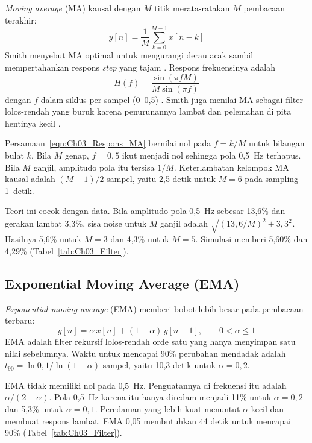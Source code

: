     \textit{Moving average} (MA) kausal dengan $M$ titik merata-ratakan $M$ pembacaan terakhir:
    \begin{equation}
        \label{eqn:Ch03_MA}
        y[n] = \frac{1}{M}\sum_{k=0}^{M-1} x[n-k]
    \end{equation}
    Smith menyebut MA optimal untuk mengurangi derau acak sambil mempertahankan respons \textit{step} yang tajam \cite{smith_dsp}. Respons frekuensinya adalah
    \begin{equation}
        \label{eqn:Ch03_Respons_MA}
        H(f) = \frac{\sin(\pi f M)}{M\sin(\pi f)}
    \end{equation}
    dengan $f$ dalam siklus per sampel (0--0,5) \cite{smith_dsp}. Smith juga menilai MA sebagai filter lolos-rendah yang buruk karena penurunannya lambat dan pelemahan di pita hentinya kecil \cite{smith_dsp}.

    Persamaan~\ref{eqn:Ch03_Respons_MA} bernilai nol pada $f = k/M$ untuk bilangan bulat $k$. Bila $M$ genap, $f = 0{,}5$ ikut menjadi nol sehingga pola 0,5~Hz terhapus. Bila $M$ ganjil, amplitudo pola itu tersisa $1/M$. Keterlambatan kelompok MA kausal adalah $(M-1)/2$ sampel, yaitu 2,5 detik untuk $M = 6$ pada sampling 1~detik.

    Teori ini cocok dengan data. Bila amplitudo pola 0,5~Hz sebesar 13,6\% dan gerakan lambat 3,3\%, sisa noise untuk $M$ ganjil adalah $\sqrt{(13{,}6/M)^2 + 3{,}3^2}$. Hasilnya 5,6\% untuk $M = 3$ dan 4,3\% untuk $M = 5$. Simulasi memberi 5,60\% dan 4,29\% (Tabel~\ref{tab:Ch03_Filter}).

    \subsection{Exponential Moving Average (EMA)}
    \label{sec:Penyaringan_EMA}

    \textit{Exponential moving average} (EMA) memberi bobot lebih besar pada pembacaan terbaru:
    \begin{equation}
        \label{eqn:Ch03_EMA}
        y[n] = \alpha\,x[n] + (1-\alpha)\,y[n-1], \qquad 0 < \alpha \le 1
    \end{equation}
    EMA adalah filter rekursif lolos-rendah orde satu yang hanya menyimpan satu nilai sebelumnya. Waktu untuk mencapai 90\% perubahan mendadak adalah $t_{90} = \ln 0{,}1 / \ln(1-\alpha)$ sampel, yaitu 10,3 detik untuk $\alpha = 0{,}2$.

    EMA tidak memiliki nol pada 0,5~Hz. Penguatannya di frekuensi itu adalah $\alpha/(2-\alpha)$. Pola 0,5~Hz karena itu hanya diredam menjadi 11\% untuk $\alpha = 0{,}2$ dan 5,3\% untuk $\alpha = 0{,}1$. Peredaman yang lebih kuat menuntut $\alpha$ kecil dan membuat respons lambat. EMA 0,05 membutuhkan 44 detik untuk mencapai 90\% (Tabel~\ref{tab:Ch03_Filter}).

